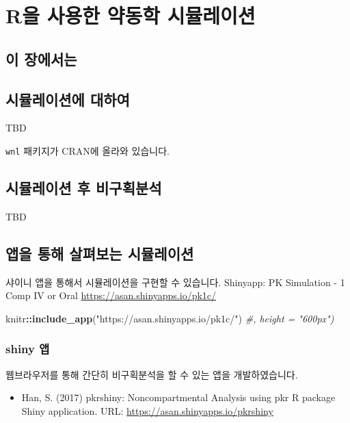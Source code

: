 \documentclass[12pt,]{krantz}
\newenvironment{Shaded}{\begin{snugshade}}{\end{snugshade}}
\newcommand{\KeywordTok}[1]{\textcolor[rgb]{0.13,0.29,0.53}{\textbf{#1}}}
\newcommand{\StringTok}[1]{\textcolor[rgb]{0.31,0.60,0.02}{#1}}
\newcommand{\CommentTok}[1]{\textcolor[rgb]{0.56,0.35,0.01}{\textit{#1}}}
\newcommand{\OperatorTok}[1]{\textcolor[rgb]{0.81,0.36,0.00}{\textbf{#1}}}
\newcommand{\NormalTok}[1]{#1}
\providecommand{\tightlist}{%
  \setlength{\itemsep}{0pt}\setlength{\parskip}{0pt}}
\theoremstyle{definition}
\theoremstyle{definition}
\theoremstyle{definition}
\theoremstyle{remark}
\begin{document}
\chapter{R을 사용한 약동학 시뮬레이션}\label{simulation}

\section{이 장에서는}\label{summary-simulation}

\section{시뮬레이션에 대하여}\label{-}

TBD

\texttt{wnl} 패키지가 CRAN에 올라와 있습니다.

\section{시뮬레이션 후 비구획분석}\label{--}

TBD

\section{앱을 통해 살펴보는 시뮬레이션}\label{---}

샤이니 앱을 통해서 시뮬레이션을 구현할 수 있습니다. Shinyapp: PK
Simulation - 1 Comp IV or Oral \url{https://asan.shinyapps.io/pk1c/}

\begin{Shaded}
\begin{Highlighting}[]
\NormalTok{knitr}\OperatorTok{::}\KeywordTok{include_app}\NormalTok{(}\StringTok{"https://asan.shinyapps.io/pk1c/"}\NormalTok{) }\CommentTok{#, height = "600px")}
\end{Highlighting}
\end{Shaded}

\subsection{shiny 앱}\label{shiny-}

웹브라우저를 통해 간단히 비구획분석을 할 수 있는 앱을 개발하였습니다.

\begin{itemize}
\tightlist
\item
  Han, S. (2017) pkrshiny: Noncompartmental Analysis using pkr R package
  Shiny application. URL: \url{https://asan.shinyapps.io/pkrshiny}
\end{itemize}
\end{document}
